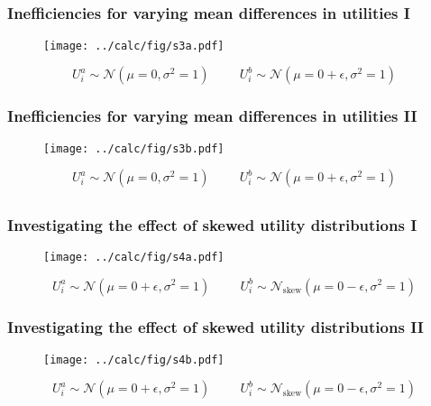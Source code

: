 \documentclass{beamer}
\begin{document}
\subsection{}
\begin{frame}%
  \frametitle{Inefficiencies for varying mean differences in utilities I}
  \begin{figure}[ht]\centering
    \texttt{[image: ../calc/fig/s3a.pdf]}
  \end{figure}
  $$U^a_i \sim \mathcal{N}(\mu=0,\sigma^2=1) \hspace{1cm}
  U^b_i \sim \mathcal{N}(\mu=0+\epsilon,\sigma^2=1)$$
\end{frame}
\begin{frame}%
  \frametitle{Inefficiencies for varying mean differences in utilities II}
  \begin{figure}[ht]\centering
    \texttt{[image: ../calc/fig/s3b.pdf]}
  \end{figure}
  $$U^a_i \sim \mathcal{N}(\mu=0,\sigma^2=1) \hspace{1cm}
  U^b_i \sim \mathcal{N}(\mu=0+\epsilon,\sigma^2=1)$$
\end{frame}

\subsection{}
\begin{frame}%
  \frametitle{Investigating the effect of skewed utility distributions I}
  \begin{figure}[ht]\centering
    \texttt{[image: ../calc/fig/s4a.pdf]}
  \end{figure}
  $$U^a_i \sim \mathcal{N}(\mu=0+\epsilon,\sigma^2=1) \hspace{1cm}
  U^b_i \sim \mathcal{N}_\text{skew}(\mu=0-\epsilon,\sigma^2=1)$$
\end{frame}
\begin{frame}%
  \frametitle{Investigating the effect of skewed utility distributions II}
  \begin{figure}[ht]\centering
    \texttt{[image: ../calc/fig/s4b.pdf]}
  \end{figure}
  $$U^a_i \sim \mathcal{N}(\mu=0+\epsilon,\sigma^2=1) \hspace{1cm}
  U^b_i \sim \mathcal{N}_\text{skew}(\mu=0-\epsilon,\sigma^2=1)$$
\end{frame}
\end{document}
